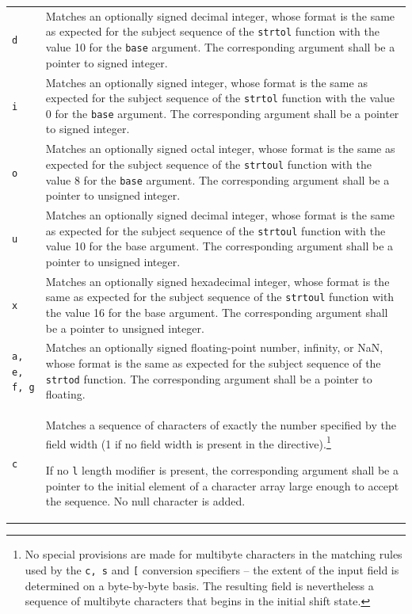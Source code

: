 \begin{longtable}{p{}p{}}
\texttt{d}&Matches an optionally signed decimal integer, whose format is the
same as expected for the subject sequence of the \texttt{strtol} function with
the value 10 for the \texttt{base} argument. The corresponding argument shall
be a pointer to signed integer.\\
\texttt{i}&Matches an optionally signed integer, whose format is the same as
expected for the subject sequence of the \texttt{strtol} function with the
value 0 for the \texttt{base} argument. The corresponding argument shall be a
pointer to signed integer.\\
\texttt{o}&Matches an optionally signed octal integer, whose format is the same
as expected for the subject sequence of the \texttt{strtoul} function with the
value 8 for the \texttt{base} argument. The corresponding argument shall be a
pointer to unsigned integer.\\
\texttt{u}&Matches an optionally signed decimal integer, whose format is the
same as expected for the subject sequence of the \texttt{strtoul} function with
the value 10 for the base argument. The corresponding argument shall be a
pointer to unsigned integer.\\
\texttt{x}&Matches an optionally signed hexadecimal integer, whose format is
the same as expected for the subject sequence of the \texttt{strtoul} function
with the value 16 for the base argument. The corresponding argument shall be a
pointer to unsigned integer.\\
\texttt{a, e, f, g}&Matches an optionally signed floating-point number,
infinity, or NaN, whose format is the same as expected for the subject sequence
of the \texttt{strtod} function. The corresponding argument shall be a pointer
to floating.\\
\texttt{c}&Matches a sequence of characters of exactly the number specified by
the field width (1 if no field width is present in the
directive).\footnote{\label{note1}No special provisions are made for multibyte
  characters in the matching rules used by the \texttt{c, s} and \texttt{[}
  conversion specifiers -- the extent of the input field is determined on a
  byte-by-byte basis. The resulting field is nevertheless a sequence of
  multibyte characters that begins in the initial shift state.}

If no \texttt{l} length modifier is present, the corresponding argument shall
be a pointer to the initial element of a character array large enough to accept
the sequence. No null character is added.


\end{longtable}

